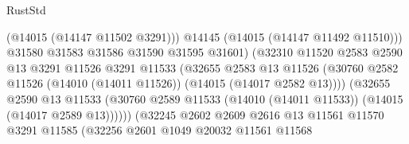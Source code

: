 \begin{lexlean}{RustStd}
\begin{coremodule}
                                              (@14015 (@14147 @11502 @3291)))
                                            @14145
                                            (@14015 (@14147 @11492 @11510)))
                                          @31580
                                          @31583
                                          @31586
                                          @31590
                                          @31595
                                          @31601)
                                        (@32310
                                          @11520
                                          @2583
                                          @2590
                                          @13
                                          @3291
                                          @11526
                                          @3291
                                          @11533
                                          (@32655
                                            @2583
                                            @13
                                            @11526
                                            (@30760
                                              @2582
                                              @11526
                                              (@14010 (@14011 @11526))
                                              (@14015 (@14017 @2582 @13))))
                                          (@32655
                                            @2590
                                            @13
                                            @11533
                                            (@30760
                                              @2589
                                              @11533
                                              (@14010 (@14011 @11533))
                                              (@14015 (@14017 @2589 @13))))))
                                      (@32245
                                        @2602
                                        @2609
                                        @2616
                                        @13
                                        @11561
                                        @11570
                                        @3291
                                        @11585
                                        (@32256
                                          @2601
                                          @1049
                                          @20032
                                          @11561
                                          @11568

\end{coremodule}
\end{lexlean}
